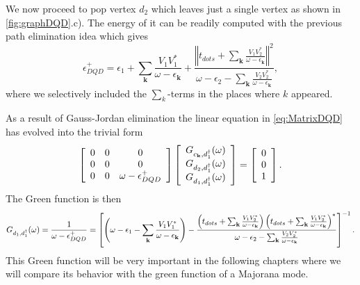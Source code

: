 We now proceed to pop vertex $d_2$ which leaves just a single vertex as  shown in \ref{fig:graphDQD}.c). The energy of it can be readily computed with the previous path elimination idea which gives 
\begin{equation}
    \epsilon^+_{DQD}=\epsilon_{1}+\sum_{\mathbf{k}}\frac{V_{1}V_{1}^{*}}{\omega-\epsilon_{\mathbf{k}}}+\frac{\left\Vert t_{dots}+\sum_{\mathbf{k}}\frac{V_{1}V_{2}^{*}}{\omega-\epsilon_{\mathbf{k}}}\right\Vert ^{2}}{\omega-\epsilon_{2}-\sum_{\mathbf{k}}\frac{V_{2}V_{2}^{*}}{\omega-\epsilon_{\mathbf{k}}}},  \label{eq:EnDQD}
\end{equation}
\noindent where we selectively included the $\sum_k$-terms in the places where $k$ appeared. 

As a result of  Gauss-Jordan elimination the linear equation in \ref{eq:MatrixDQD} has evolved into the trivial form 
\begin{equation}
\left[\begin{array}{ccc}
0 & 0 & 0\\
0 & 0 & 0\\
0 & 0 & \omega-\epsilon_{DQD}^{+}
\end{array}\right]\left[\begin{array}{c}
G_{c_{\mathbf{k}},d_{1}^{\dagger}}(\omega)\\
G_{d_{2},d_{1}^{\dagger}}(\omega)\\
G_{d_{1},d_{1}^{\dagger}}(\omega)
\end{array}\right]=\left[\begin{array}{c}
0\\
0\\
1
\end{array}\right].
\end{equation}
The Green function is then 
\begin{align}
G_{d_{1},d_{1}^{\dagger}}(\omega)=\frac{1}{\omega -  \epsilon^+_{DQD}} =\left[\left(\omega-\epsilon_{1}-\sum_{\mathbf{k}}\frac{V_{1}V_{1}^{*}}{\omega-\epsilon_{\mathbf{k}}}\right)-\frac{\left(t_{dots}+\sum_{\mathbf{k}}\frac{V_{1}V_{2}^{*}}{\omega-\epsilon_{\mathbf{k}}}\right)\left(t_{dots}+\sum_{\mathbf{k}}\frac{V_{1}V_{2}^{*}}{\omega-\epsilon_{\mathbf{k}}}\right)^{*}}{\omega-\epsilon_{2}-\sum_{\mathbf{k}}\frac{V_2V_{2}^{*}}{\omega-\epsilon_{\mathbf{k}}}}\right]^{-1}. \label{eq:SumSolGreen} 
\end{align}
This Green function will be very important in the following chapters where we will compare its behavior with the green function of a Majorana mode. 

